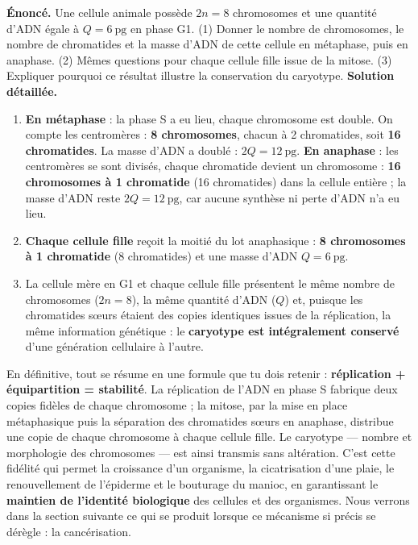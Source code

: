 \documentclass[11pt]{article}
\newcounter{popsec}
\newcounter{popsub}
\newcommand{\courssub}[1]{%
  \stepcounter{popsub}%
  \par\vspace{9pt}\noindent{\popxbold\fontsize{11.5}{13}\selectfont\color{popink}{\color{poporange}\thepopsec.\thepopsub}\hspace{6pt}#1}\par\nopagebreak\vspace{4pt}
}
\begin{document}
\courssub{Exercice résolu et conclusion}

\begin{exoresolu}
\textbf{Énoncé.} Une cellule animale possède $2n = 8$ chromosomes et une quantité d'ADN égale à $Q = \SI{6}{\pico\gram}$ en phase G1. (1) Donner le nombre de chromosomes, le nombre de chromatides et la masse d'ADN de cette cellule en métaphase, puis en anaphase. (2) Mêmes questions pour chaque cellule fille issue de la mitose. (3) Expliquer pourquoi ce résultat illustre la conservation du caryotype.
\tcblower
\textbf{Solution détaillée.}
\begin{enumerate}
\item \textbf{En métaphase} : la phase S a eu lieu, chaque chromosome est double. On compte les centromères : \textbf{8 chromosomes}, chacun à 2 chromatides, soit \textbf{16 chromatides}. La masse d'ADN a doublé : $2Q = \SI{12}{\pico\gram}$. \textbf{En anaphase} : les centromères se sont divisés, chaque chromatide devient un chromosome : \textbf{16 chromosomes à 1 chromatide} (16 chromatides) dans la cellule entière ; la masse d'ADN reste $2Q = \SI{12}{\pico\gram}$, car aucune synthèse ni perte d'ADN n'a eu lieu.
\item \textbf{Chaque cellule fille} reçoit la moitié du lot anaphasique : \textbf{8 chromosomes à 1 chromatide} (8 chromatides) et une masse d'ADN $Q = \SI{6}{\pico\gram}$.
\item La cellule mère en G1 et chaque cellule fille présentent le même nombre de chromosomes ($2n = 8$), la même quantité d'ADN ($Q$) et, puisque les chromatides sœurs étaient des copies identiques issues de la réplication, la même information génétique : le \textbf{caryotype est intégralement conservé} d'une génération cellulaire à l'autre.
\end{enumerate}
\end{exoresolu}

En définitive, tout se résume en une formule que tu dois retenir : \textbf{réplication + équipartition = stabilité}. La réplication de l'ADN en phase S fabrique deux copies fidèles de chaque chromosome ; la mitose, par la mise en place métaphasique puis la séparation des chromatides sœurs en anaphase, distribue une copie de chaque chromosome à chaque cellule fille. Le caryotype — nombre et morphologie des chromosomes — est ainsi transmis sans altération. C'est cette fidélité qui permet la croissance d'un organisme, la cicatrisation d'une plaie, le renouvellement de l'épiderme et le bouturage du manioc, en garantissant le \textbf{maintien de l'identité biologique} des cellules et des organismes. Nous verrons dans la section suivante ce qui se produit lorsque ce mécanisme si précis se dérègle : la cancérisation.
\end{document}
